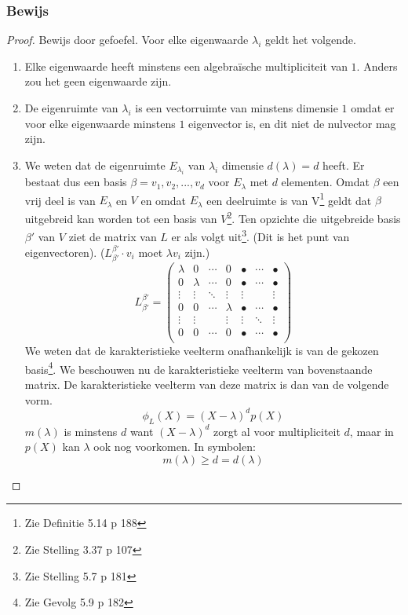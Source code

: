 \documentclass[lineaire_algebra_oplossingen.tex]{subfiles}
\begin{document}
\subsubsection*{Bewijs}
\begin{proof}
Bewijs door gefoefel.
Voor elke eigenwaarde $\lambda_i$ geldt het volgende.
\begin{enumerate}
\item Elke eigenwaarde heeft minstens een algebra\"ische multipliciteit van $1$.
Anders zou het geen eigenwaarde zijn.

\item De eigenruimte van $\lambda_i$ is een vectorruimte van minstens dimensie $1$ omdat er voor elke eigenwaarde minstens $1$ eigenvector is, en dit niet de nulvector mag zijn.

\item
We weten dat de eigenruimte $E_{\lambda_i}$ van $\lambda_i$ dimensie $d(\lambda) = d$ heeft.
Er bestaat dus een basis $\beta = v_1,v_2,...,v_d$ voor $E_\lambda$ met $d$ elementen.
Omdat $\beta$ een vrij deel is van $E_\lambda$ en $V$ en omdat $E_\lambda$ een deelruimte is van V\footnote{Zie Definitie 5.14 p 188} geldt dat $\beta$ uitgebreid kan worden tot een basis van $V$\footnote{Zie Stelling 3.37 p 107}.
Ten opzichte die uitgebreide basis $\beta'$ van $V$ ziet de matrix van $L$ er als volgt uit\footnote{Zie Stelling 5.7 p 181}.
(Dit is het punt van eigenvectoren).
($L_{\beta'}^{\beta'}\cdot v_i$ moet $\lambda v_i$ zijn.)
\[
L_{\beta'}^{\beta'} = 
\begin{pmatrix}
\lambda & 0 & \cdots & 0 & \bullet & \cdots & \bullet\\
0 & \lambda & \cdots & 0 & \bullet & \cdots & \bullet\\
\vdots & \vdots & \ddots & \vdots & \vdots & &  \vdots\\
0 & 0 & \cdots & \lambda & \bullet & \cdots & \bullet\\
\vdots & \vdots & & \vdots & \vdots & \ddots & \vdots\\
0 & 0 &\cdots & 0 & \bullet & \cdots & \bullet\\
\end{pmatrix}
\]
We weten dat de karakteristieke veelterm onafhankelijk is van de gekozen basis\footnote{Zie Gevolg 5.9 p 182}. We beschouwen nu de karakteristieke veelterm van bovenstaande matrix.
De karakteristieke veelterm van deze matrix is dan van de volgende vorm. 
\[
\phi_L(X) = (X-\lambda)^dp(X)
\]
$m(\lambda)$ is minstens $d$ want $(X-\lambda)^d$ zorgt al voor multipliciteit $d$, maar in $p(X)$ kan $\lambda$ ook nog voorkomen. In symbolen:
\[
m(\lambda) \ge d = d(\lambda)
\]
\end{enumerate}
\end{proof}
\end{document}
